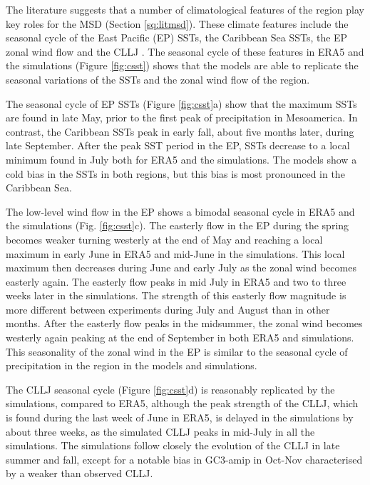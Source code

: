 The literature suggests that a number of climatological features of the region play key roles for the MSD (Section \ref{sq:litmsd}). These climate features include the seasonal cycle of the East Pacific (EP) SSTs, the Caribbean Sea SSTs, the EP zonal wind flow and the CLLJ \citep{magana1999,amador2008,herrera2015,straffon2019,garcia2020sub}. 
The seasonal cycle of these features in ERA5 and the simulations (Figure \ref{fig:csst}) shows that the models are able to replicate the seasonal variations of the SSTs and the zonal wind flow of the region. %

The seasonal cycle of EP SSTs (Figure \ref{fig:csst}a) show that the maximum SSTs are found in late May, prior to the first peak of precipitation in Mesoamerica. In contrast, the Caribbean SSTs peak in early fall, about five months later, during late September. After the peak SST period in the EP, SSTs decrease to a local minimum found in July both for ERA5 and the simulations. The models show a cold bias in the SSTs in both regions, but this bias is most pronounced in the Caribbean Sea.

 The low-level wind flow in the EP shows a bimodal seasonal cycle in ERA5 and the simulations (Fig. \ref{fig:csst}c).
The easterly flow in the EP during the spring becomes weaker turning westerly at the end of May and reaching a local maximum in early June in ERA5 and mid-June in the simulations. This local maximum then decreases during June and early July as the zonal wind becomes easterly again. The easterly flow peaks in mid July in ERA5 and two to three weeks later in the simulations. The strength of this easterly flow magnitude  is more different between experiments during July and August than in other months. 
After the easterly flow peaks in the midsummer, the zonal wind becomes westerly again peaking at the end of September in both ERA5 and simulations. 
This seasonality of the zonal wind in the EP is similar to the seasonal cycle of precipitation in the region in the models and simulations. %

The CLLJ seasonal cycle (Figure \ref{fig:csst}d) is reasonably replicated by the simulations, compared to ERA5, although the peak strength of the CLLJ, which is found during the last week of June in ERA5, is delayed in the simulations by about three weeks, as the simulated CLLJ peaks in mid-July in all the simulations.
The simulations follow closely the evolution of the CLLJ in late summer and fall, except for a notable bias in GC3-amip in Oct-Nov characterised by a weaker than observed CLLJ.

